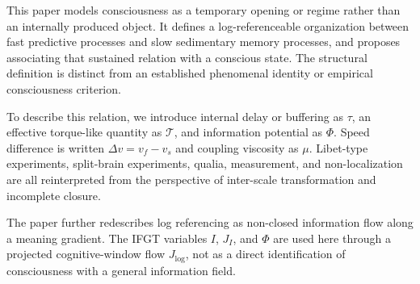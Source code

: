 This paper models consciousness as a temporary opening or regime rather than an internally produced object. It defines a log-referenceable organization between fast predictive processes and slow sedimentary memory processes, and proposes associating that sustained relation with a conscious state. The structural definition is distinct from an established phenomenal identity or empirical consciousness criterion.

To describe this relation, we introduce internal delay or buffering as $\tau$, an effective torque-like quantity as $\mathcal{T}$, and information potential as $\Phi$. Speed difference is written $\Delta v = v_f - v_s$ and coupling viscosity as $\mu$. Libet-type experiments, split-brain experiments, qualia, measurement, and non-localization are all reinterpreted from the perspective of inter-scale transformation and incomplete closure.

The paper further redescribes log referencing as non-closed information flow along a meaning gradient. The IFGT variables $I$, $J_I$, and $\Phi$ are used here through a projected cognitive-window flow $J_{\log}$, not as a direct identification of consciousness with a general information field.
